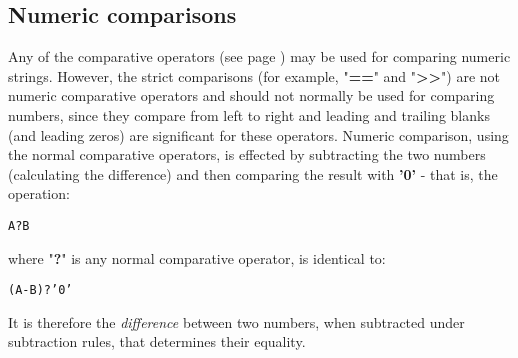 \subsection{Numeric comparisons}\label{arithnumericcomparisons}
 Any of the  comparative operators (see page \pageref{refcomps})  may be used
for comparing numeric strings.
However, the strict comparisons (for example, "\textbf{==}" and
"\textbf{>{}>}") are not numeric comparative operators and should
not normally be used for comparing numbers, since they compare from left
to right and leading and trailing blanks (and leading zeros) are
significant for these operators.
 Numeric comparison, using the normal comparative operators, is
effected by subtracting the two numbers (calculating the difference) and
then comparing the result with \textbf{'0'} - that is, the
operation:
\begin{alltt}
A ? B
\end{alltt}
where "\textbf{?}" is any normal comparative operator, is
identical to:
\begin{alltt}
(A - B) ? '0'
\end{alltt}
It is therefore the \emph{difference} between two numbers, when
subtracted under \nr{} subtraction rules, that determines their equality.
